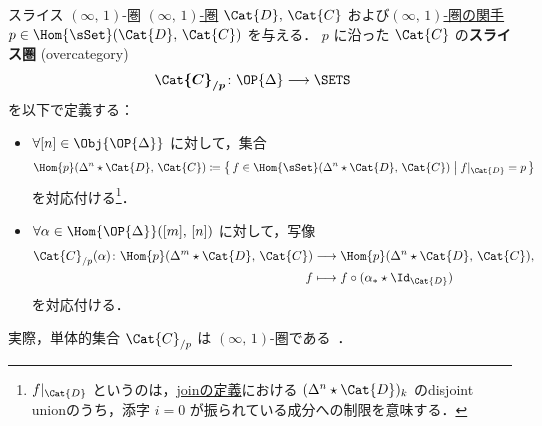 \documentclass[TQFT_main]{subfiles}
\begin{document}
\begin{mydef}[label=def:overcat-infty,breakable]{スライス {$(\infty,\, 1)$}-圏}
    \hyperref[def:infinity-1]{$(\infty,\, 1)$-圏} $\Cat{D},\, \Cat{C}$ および\hyperref[def:infinity-1]{$(\infty,\, 1)$-圏の関手} $p \in \Hom{\sSet} (\Cat{D},\, \Cat{C})$ を与える．
    $p$ に沿った $\Cat{C}$ の\textbf{スライス圏} (overcategory) 
    \begin{align}
        \bm{\Cat{C}_{/p}} \colon \OP{\Delta} &\lto \SETS
    \end{align}
    を以下で定義する：
    \begin{itemize}
        \item $\forall [n] \in \Obj{\OP{\Delta}}$ に対して，集合
        \begin{align}
            \Hom{p} (\Delta^n \star \Cat{D},\, \Cat{C})
            \coloneqq \bigl\{\, f \in \Hom{\sSet} (\Delta^n \star \Cat{D},\, \Cat{C}) \bigm| f|_{\Cat{D}} = p \,\bigr\} 
        \end{align}
        を対応付ける\footnote{$f|_{\Cat{D}}$ というのは，\hyperref[def:Simp-Join]{joinの定義}における $(\Delta^n \star \Cat{D})_k$ のdisjoint unionのうち，添字 $i=0$ が振られている成分への制限を意味する．}．
        \item $\forall \alpha \in \Hom{\OP{\Delta}} ([m],\, [n])$ に対して，写像
        \begin{align}
            \Cat{C}_{/p} (\alpha) \colon \Hom{p} (\Delta^m \star \Cat{D},\, \Cat{C}) &\lto \Hom{p} (\Delta^n \star \Cat{D},\, \Cat{C}), \\
            f &\lmto f \circ (\alpha_* \star \Id_{\Cat{D}})
        \end{align}
        を対応付ける．
    \end{itemize}
    実際，単体的集合 $\Cat{C}_{/p}$ は $(\infty,\, 1)$-圏である~\cite[\href{https://kerodon.net/tag/018F}{Tag 018F}]{kerodon}．
    
    \tcblower


\end{mydef}
\end{document}
